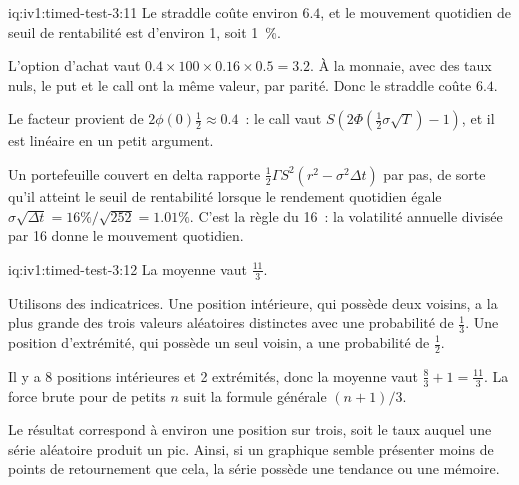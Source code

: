 \begin{solution}{iq:iv1:timed-test-3:11}
Le straddle coûte environ $6.4$, et le mouvement quotidien de seuil de rentabilité est d'environ 1, soit 1~\%.

L'option d'achat vaut $0.4 \times 100 \times 0.16 \times 0.5 = 3.2$. À la monnaie, avec des taux nuls, le put et le call ont la même valeur, par parité. Donc le straddle coûte $6.4$.

Le facteur provient de $2\phi(0)\frac12 \approx 0.4$~: le call vaut $S(2\Phi(\frac12\sigma\sqrt{T}) - 1)$, et il est linéaire en un petit argument.

Un portefeuille couvert en delta rapporte $\frac12\Gamma S^2(r^2 - \sigma^2\Delta t)$ par pas, de sorte qu'il atteint le seuil de rentabilité lorsque le rendement quotidien égale $\sigma\sqrt{\Delta t} = 16\%/\sqrt{252} = 1.01\%$. C'est la règle du 16~: la volatilité annuelle divisée par 16 donne le mouvement quotidien.


\end{solution}

\begin{solution}{iq:iv1:timed-test-3:12}
La moyenne vaut $\frac{11}{3}$.

Utilisons des indicatrices. Une position intérieure, qui possède deux voisins, a la plus grande des trois valeurs aléatoires distinctes avec une probabilité de $\frac13$. Une position d'extrémité, qui possède un seul voisin, a une probabilité de $\frac12$.

Il y a 8 positions intérieures et 2 extrémités, donc la moyenne vaut $\frac83 + 1 = \frac{11}{3}$. La force brute pour de petits $n$ suit la formule générale $(n + 1)/3$.

Le résultat correspond à environ une position sur trois, soit le taux auquel une série aléatoire produit un pic. Ainsi, si un graphique semble présenter moins de points de retournement que cela, la série possède une tendance ou une mémoire.

\end{solution}
